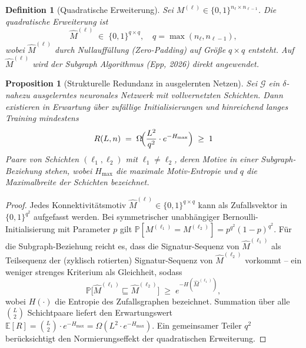 ﻿\documentclass[12pt, a4paper, openany]{report}
\newtheorem{proposition}[theorem]{Proposition}
\newtheorem{definition}[theorem]{Definition}
\newcommand{\E}{\mathbb{E}}
\newcommand{\Prob}{\mathbb{P}}
\newcommand{\calG}{\mathcal{G}}
\begin{document}
\begin{definition}[Quadratische Erweiterung]
\label{def:square_motif}
Sei $M^{(\ell)} \in \{0,1\}^{n_\ell \times n_{\ell-1}}$.  Die
\emph{quadratische Erweiterung} ist
\[
  \hat{M}^{(\ell)} \;\in\; \{0,1\}^{q \times q},
  \quad q = \max(n_\ell, n_{\ell-1}),
\]
wobei $\hat{M}^{(\ell)}$ durch Nullauffüllung (Zero-Padding) auf Größe
$q \times q$ entsteht.  Auf $\hat{M}^{(\ell)}$ wird der Subgraph Algorithmus
(Epp, 2026) direkt angewendet.
\end{definition}

\begin{proposition}[Strukturelle Redundanz in ausgelernten Netzen]
\label{prop:redundancy}
Sei $\calG$ ein $\delta$-nahezu ausgelerntes neuronales Netzwerk mit
vollvernetzten Schichten.  Dann existieren in Erwartung über zufällige
Initialisierungen und hinreichend langes Training mindestens
\[
  R(L, n)
  \;=\;
  \Omega\!\Bigl(\frac{L^2}{q^2} \cdot e^{-H_{\max}}\Bigr)
  \;\geq\; 1
\]
Paare von Schichten $(\ell_1, \ell_2)$ mit $\ell_1 \neq \ell_2$, deren
Motive in einer Subgraph-Beziehung stehen, wobei $H_{\max}$ die maximale
Motiv-Entropie und $q$ die Maximalbreite der Schichten bezeichnet.
\end{proposition}

\begin{proof}
Jedes Konnektivitätsmotiv $\hat{M}^{(\ell)} \in \{0,1\}^{q\times q}$ kann
als Zufallsvektor in $\{0,1\}^{q^2}$ aufgefasst werden.  Bei symmetrischer
unabhängiger Bernoulli-Initialisierung mit Parameter $p$ gilt
$\Prob[M^{(\ell_1)} = M^{(\ell_2)}] = p^{q^2}(1-p)^{q^2}$.  Für die
Subgraph-Beziehung reicht es, dass die Signatur-Sequenz von $\hat{M}^{(\ell_1)}$
als Teilsequenz der (zyklisch rotierten) Signatur-Sequenz von $\hat{M}^{(\ell_2)}$
vorkommt -- ein weniger strenges Kriterium als Gleichheit, sodass
\[
  \Prob\!\bigl[\hat{M}^{(\ell_1)} \sqsubseteq \hat{M}^{(\ell_2)}\bigr]
  \;\geq\; e^{-H(\hat{M}^{(\ell_1)})},
\]
wobei $H(\cdot)$ die Entropie des Zufallsgraphen bezeichnet.
Summation über alle $\binom{L}{2}$ Schicht\-paare liefert den Erwartungswert
$\E[R] = \binom{L}{2} \cdot e^{-H_{\max}} = \Omega(L^2 \cdot e^{-H_{\max}})$.
Ein gemeinsamer Teiler $q^2$ berücksichtigt den Normierungseffekt der
quadratischen Erweiterung.
\end{proof}

\end{document}
